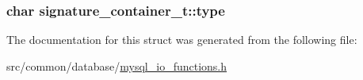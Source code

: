 \subsubsection[{\texorpdfstring{type}{type}}]{\setlength{\rightskip}{0pt plus 5cm}char signature\+\_\+container\+\_\+t\+::type}\hypertarget{structsignature__container__t_a3b1d67e93302ecd687db847f2bdfca16}{}\label{structsignature__container__t_a3b1d67e93302ecd687db847f2bdfca16}


The documentation for this struct was generated from the following file\+:\begin{DoxyCompactItemize}
\item 
src/common/database/\hyperlink{mysql__io__functions_8h}{mysql\+\_\+io\+\_\+functions.\+h}\end{DoxyCompactItemize}
